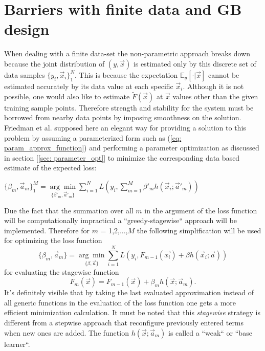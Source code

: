 \documentclass[12pt, a4paper]{article}
\begin{document}
\section{Barriers with finite data and GB design}
When dealing with a finite data-set the non-parametric approach breaks down because the joint distribution of $(y,\vec{x})$ is estimated only by this discrete set of data samples $\{y_i,\vec{x}_i\}_1^N$. This is because the expectation $\mathbb{E}_y[\cdot|\vec{x}]$ cannot be estimated accurately by its data value at each specific $\vec{x}_i$. Although it is not possible, one would also like to estimate $\tilde{F}(\vec{x})$ at $\vec{x}$ values other than the given training sample points.
Therefore strength and stability for the system must be borrowed from nearby data points by imposing smoothness on the solution. 
Friedman et al. supposed here an elegant way for providing a solution to this problem by assuming a parameterized form such as (\ref{eq: param_approx_function}) and performing a parameter optimization as discussed in section [\ref{sec: parameter_opt}] to minimize the corresponding data based estimate of the expected loss:
\begin{center}
    $\{\beta_m,\vec{a}_m\}_1^M = \underset{ \{\beta'_m,\vec{a}'_m \} }{\arg\min} 
    \sum_{i=1}^N L
    \left(y_i,\sum_{m=1}^M\beta'_{m} h(\vec{x}_i;\vec{a}'_m)\right)$
\end{center}
Due the fact that the summation over all $m$ in the argument of the loss function will be computationally impractical a ``greedy-stagewise`` approach will be implemented. Therefore for $m$ = 1,2,...,$M$ the following simplification will be used for optimizing the loss function
\begin{equation}
    \label{eq: greedy_stagewise}
        \{\beta_m,\vec{a}_m\} = \underset{ \{\beta,\vec{a} \} }{\arg\min} 
    \sum_{i=1}^N L
    (y_i,F_{m-1}(\vec{x_i}) + \beta h(\vec{x}_i;\vec{a}))
\end{equation}
for evaluating the stagewise function 
\begin{equation}
    F_m(\vec{x}) = F_{m-1}(\vec{x}) + \beta_m h(\vec{x};\vec{a}_m).
\end{equation}
It's definitely visible that by taking the last evaluated approximation instead of all generic functions in the evaluation of the loss function one gets a more efficient minimization calculation.
It must be noted that this \textit{stagewise} strategy is different from a stepwise approach that reconfigure previously entered terms when new ones are added. The function $h(\vec{x};\vec{a}_m)$ is called a ``weak`` or ``base learner``. \\
\end{document}
